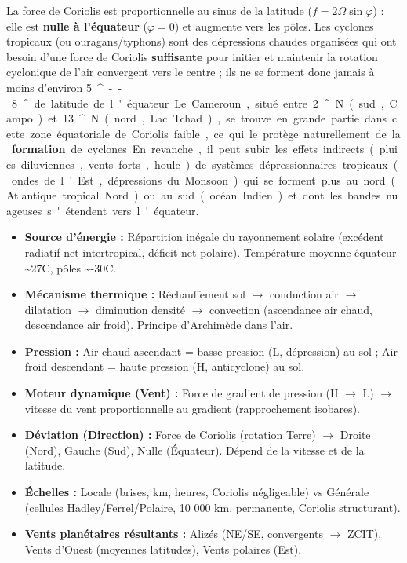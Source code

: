 \documentclass[11pt]{article}
\providecommand{\degree}{^{\circ}}
\newcounter{popsec}
\newcounter{popsub}
\newcommand{\courssub}[1]{%
  \stepcounter{popsub}%
  \par\vspace{9pt}\noindent{\popxbold\fontsize{11.5}{13}\selectfont\color{popink}{\color{poporange}\thepopsec.\thepopsub}\hspace{6pt}#1}\par\nopagebreak\vspace{4pt}
}
\begin{document}
\begin{savaistu}
La force de Coriolis est proportionnelle au sinus de la latitude ($f = 2\Omega\sin\varphi$) : elle est \textbf{nulle à l'équateur} ($\varphi=0$) et augmente vers les pôles. Les cyclones tropicaux (ou ouragans/typhons) sont des dépressions chaudes organisées qui ont besoin d'une force de Coriolis \textbf{suffisante} pour initier et maintenir la rotation cyclonique de l'air convergent vers le centre ; ils ne se forment donc jamais à moins d'environ \SI{5}{\degree}--\SI{8}{\degree} de latitude de l'équateur. Le Cameroun, situé entre \SI{2}{\degree} N (sud, Campo) et \SI{13}{\degree} N (nord, Lac Tchad), se trouve en grande partie dans cette zone équatoriale de Coriolis faible, ce qui le protège naturellement de la \textbf{formation} de cyclones. En revanche, il peut subir les effets indirects (pluies diluviennes, vents forts, houle) de systèmes dépressionnaires tropicaux (ondes de l'Est, dépressions du Monsoon) qui se forment plus au nord (Atlantique tropical Nord) ou au sud (océan Indien) et dont les bandes nuageuses s'étendent vers l'équateur.
\end{savaistu}

\courssub{Synthèse des moteurs}

\begin{aretenir}
\begin{itemize}
  \item \textbf{Source d'énergie :} Répartition inégale du rayonnement solaire (excédent radiatif net intertropical, déficit net polaire). Température moyenne équateur \textasciitilde 27\textdegree C, pôles \textasciitilde -30\textdegree C.
  \item \textbf{Mécanisme thermique :} Réchauffement sol $\rightarrow$ conduction air $\rightarrow$ dilatation $\rightarrow$ diminution densité $\rightarrow$ convection (ascendance air chaud, descendance air froid). Principe d'Archimède dans l'air.
  \item \textbf{Pression :} Air chaud ascendant = basse pression (L, dépression) au sol ; Air froid descendant = haute pression (H, anticyclone) au sol.
  \item \textbf{Moteur dynamique (Vent) :} Force de gradient de pression (H $\rightarrow$ L) $\rightarrow$ vitesse du vent proportionnelle au gradient (rapprochement isobares).
  \item \textbf{Déviation (Direction) :} Force de Coriolis (rotation Terre) $\rightarrow$ Droite (Nord), Gauche (Sud), Nulle (Équateur). Dépend de la vitesse et de la latitude.
  \item \textbf{Échelles :} Locale (brises, km, heures, Coriolis négligeable) vs Générale (cellules Hadley/Ferrel/Polaire, 10 000 km, permanente, Coriolis structurant).
  \item \textbf{Vents planétaires résultants :} Alizés (NE/SE, convergents $\rightarrow$ ZCIT), Vents d'Ouest (moyennes latitudes), Vents polaires (Est).
\end{itemize}
\end{aretenir}
\end{document}
